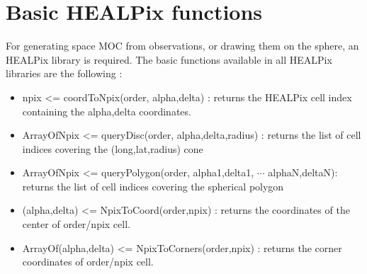 \section{Basic HEALPix functions}
For generating space MOC from observations, or drawing them on the
sphere, an HEALPix library is required. The basic functions available
in all HEALPix libraries are the following :
\begin{itemize}
   \item npix <= coordToNpix(order, alpha,delta) : returns the HEALPix
     cell index containing the alpha,delta coordinates.
   \item ArrayOfNpix <= queryDisc(order, alpha,delta,radius) : returns
     the list of cell indices covering the (long,lat,radius) cone
   \item ArrayOfNpix <= queryPolygon(order, alpha1,delta1, $\cdots$
     alphaN,deltaN): returns the list of cell indices covering the
     spherical polygon
   \item (alpha,delta) <= NpixToCoord(order,npix) : returns the
     coordinates of the center of order/npix cell.
   \item ArrayOf(alpha,delta) <= NpixToCorners(order,npix) : returns
     the corner coordinates of order/npix cell.
\end{itemize}

